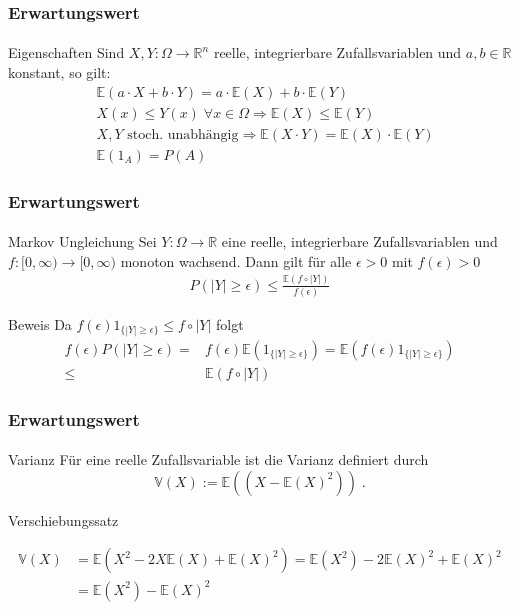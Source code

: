 \documentclass{beamer}
\begin{document}
\begin{frame}
    \frametitle{Erwartungswert}
\framesubtitle{}
\begin{block}{Eigenschaften}
Sind $X,Y : \Omega \to \mathbb{R}^n$   reelle, integrierbare  Zufallsvariablen und $a,b \in \mathbb{R}$ konstant, so gilt:
\begin{align*}
& \mathbb{E}(a \cdot X + b \cdot Y) = a \cdot \mathbb{E}(X) + b \cdot \mathbb{E}(Y) \\
& X(x) \leq Y(x) \;  \forall x \in \Omega \Rightarrow \mathbb{E}(X) \leq \mathbb{E}(Y) \\
& X ,Y \text{ stoch. unabhängig} \Rightarrow   \mathbb{E}(X \cdot Y) =  \mathbb{E}(X) \cdot  \mathbb{E}(Y) \\
& \mathbb{E} (1_A) = P (A)
\end{align*}
\end{block}
 \end{frame}


\begin{frame}
    \frametitle{Erwartungswert}
\framesubtitle{}
\begin{block}{Markov Ungleichung}
Sei $Y : \Omega \to \mathbb{R}$  eine  reelle, integrierbare  Zufallsvariablen und $f : [0, \infty) \to [0, \infty)$ monoton wachsend.
Dann gilt für alle $\epsilon > 0$ mit $f(\epsilon) > 0$
\begin{align*}
P (|Y |  \geq \epsilon) \leq \frac{\mathbb{E} (f \circ |Y|)}{f(\epsilon)}
\end{align*}
\end{block}
\begin{block}{Beweis}
Da $f(\epsilon) 1_{\{ |Y| \geq  \epsilon \} } \leq f \circ |Y|$ folgt
\begin{align*}
f(\epsilon) P(|Y| \geq \epsilon) = & f(\epsilon) \mathbb{E}(1_{\{ |Y| \geq  \epsilon \} }) = \mathbb{E}( f(\epsilon) 1_{\{ |Y| \geq  \epsilon \} }) \\
\leq & \mathbb{E}( f \circ |Y|)
\end{align*}
\end{block}
 \end{frame}


\begin{frame}
    \frametitle{Erwartungswert}
\framesubtitle{}
\begin{block}{Varianz}
Für eine reelle Zufallsvariable ist die Varianz definiert durch
$$ \mathbb{V} (X) :=  \mathbb{E}( (X - \mathbb{E}(X)^2)) \; .$$
\end{block}
\begin{block}{Verschiebungssatz}

\begin{align*}
 \mathbb{V}(X) & = \mathbb{E}(X^2 - 2X \mathbb{E}(X) + \mathbb{E}(X)^2) = \mathbb{E}(X^2) - 2 \mathbb{E}(X)^2 +  \mathbb{E}(X)^2 \\
& =  \mathbb{E}(X^2) -  \mathbb{E}(X)^2 \\
\end{align*}
\end{block}
 \end{frame}
\end{document}
